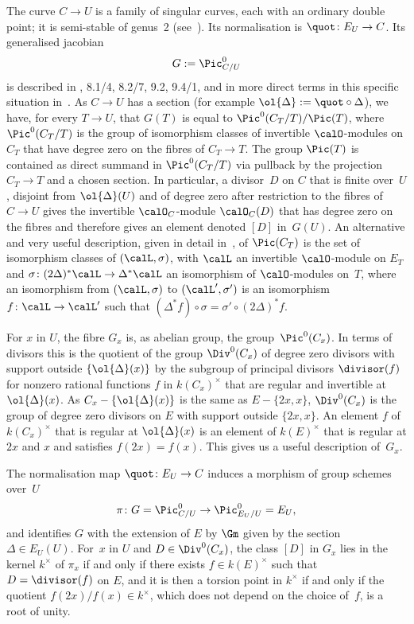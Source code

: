 The curve $C\to U$ is a family of singular curves, each with an
ordinary double point; it is semi-stable of genus~2
(see~\cite[9.2/6, 9.2/8]{BLR}). Its normalisation is
$\quot\colon E_U \to C$. Its generalised jacobian
\[
G:=\Pic^0_{C/U}
\]
is described in \cite{BLR}, 8.1/4, 8.2/7, 9.2, 9.4/1, and
in more direct terms in this specific situation in~\cite{Howe}. As
$C\to U$ has a section (for example $\ol{\Delta}:=\quot\circ \Delta$),
we have, for every $T\to U$, that $G(T)$ is equal to $\Pic^0(C_T/T)/\Pic(T)$, where
$\Pic^0(C_T/T)$ is the group of isomorphism classes of invertible
$\calO$-modules on $C_T$ that have degree zero on the fibres
of $C_T\to T$. The group $\Pic(T)$ is contained as direct
summand in $\Pic^0(C_T/T)$ via pullback by the projection
$C_T\to T$ and a chosen section. In particular, a divisor~$D$
on $C$ that is finite over~$U$, disjoint from $\ol{\Delta}(U)$ and of
degree zero after restriction to the fibres of $C\to U$ gives the
invertible $\calO_C$-module $\calO_C(D)$ that has degree zero on the
fibres and therefore gives an element denoted $[D]$ in~$G(U)$. An
alternative and very useful description, given in detail
in~\cite{Howe}, of $\Pic(C_T)$ is the set of isomorphism
classes of $(\calL,\sigma)$, with $\calL$ an invertible $\calO$-module
on $E_T$ and $\sigma\colon (2\Delta)^*\calL\to \Delta^*\calL$
an isomorphism of $\calO$-modules on~$T$, where an isomorphism from
$(\calL,\sigma)$ to $(\calL',\sigma')$ is an isomorphism
$f\colon\calL\to\calL'$ such that $(\Delta^*f)\circ\sigma =
\sigma'\circ (2\Delta)^*f$.

For $x$ in $U$, the fibre $G_x$ is, as abelian group, the
group~$\Pic^0(C_x)$. In terms of divisors this is the quotient of the
group $\Div^0(C_x)$ of degree zero divisors with support outside
$\{\ol{\Delta}(x)\}$ by the subgroup of principal divisors
$\divisor(f)$ for nonzero rational functions $f$ in $k(C_x)^\times$
that are regular and invertible at~$\ol{\Delta}(x)$. As
$C_x-\{\ol{\Delta}(x)\}$ is the same as $E-\{2x,x\}$, $\Div^0(C_x)$ is
the group of degree zero divisors on $E$ with support outside
$\{2x,x\}$. An element $f$ of $k(C_x)^\times$ that is regular at
$\ol{\Delta}(x)$ is an element of $k(E)^\times$ that is regular at
$2x$ and $x$ and satisfies $f(2x)=f(x)$. This gives us a useful
description of~$G_x$.

The normalisation map $\quot\colon E_U\to C$ induces a morphism of
group schemes over~$U$\vspace*{-3pt}
\[
\pi\colon G = \Pic^0_{C/U} \to \Pic^0_{E_U/U} = E_U,
\]
and identifies $G$ with the extension of $E$ by $\Gm$ given by the
section $\Delta\in E_U(U)$. For~$x$ in $U$ and $D \in
\Div^0(C_x)$, the class $[D]$ in $G_x$ lies in the kernel
$k^\times$ of $\pi_x$ if and only if there exists $f \in
k(E)^\times$ such that $D=\divisor(f)$ on $E$, and it
is then a torsion point in $k^\times$ if and only if the quotient
$f(2x)/f(x) \in k^\times$, which does not depend on the
choice of~$f$, is a root of unity.

